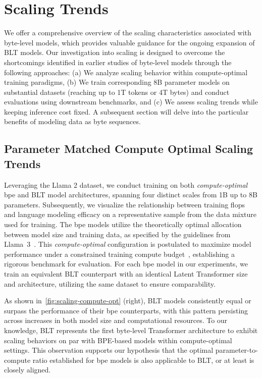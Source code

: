 \section{Scaling Trends}
\label{section:scaling}

We offer a comprehensive overview of the scaling characteristics associated with byte-level models, which provides valuable guidance for the ongoing expansion of {\textsc BLT} models. Our investigation into scaling is designed to overcome the shortcomings identified in earlier studies of byte-level models through the following approaches: (a) We analyze scaling behavior within compute-optimal training paradigms, (b) We train corresponding 8B parameter models on substantial datasets (reaching up to 1T tokens or 4T bytes) and conduct evaluations using downstream benchmarks, and (c) We assess scaling trends while keeping inference cost fixed. A subsequent section will delve into the particular benefits of modeling data as byte sequences.

\subsection{Parameter Matched Compute Optimal Scaling Trends}
\label{section:parameter-matched-scaling}
Leveraging the Llama 2 dataset, we conduct training on both \textit{compute-optimal} bpe and {\textsc BLT} model architectures, spanning four distinct scales from 1B up to 8B parameters. Subsequently, we visualize the relationship between training flops and language modeling efficacy on a representative sample from the data mixture used for training. The bpe models utilize the theoretically optimal allocation between model size and training data, as specified by the guidelines from Llama~3~\citep{dubey2024llama}. This \textit{compute-optimal} configuration is postulated to maximize model performance under a constrained training compute budget~\citep{hoffmann2022training}, establishing a rigorous benchmark for evaluation. For each bpe model in our experiments, we train an equivalent {\textsc BLT} counterpart with an identical Latent Transformer size and architecture, utilizing the same dataset to ensure comparability.

As shown in~\autoref{fig:scaling-compute-opt} (right), {\textsc BLT} models consistently equal or surpass the performance of their bpe counterparts, with this pattern persisting across increases in both model size and computational resources. To our knowledge, {\textsc BLT} represents the first byte-level Transformer architecture to exhibit scaling behaviors on par with BPE-based models within compute-optimal settings. This observation supports our hypothesis that the optimal parameter-to-compute ratio established for bpe models is also applicable to {\textsc BLT}, or at least is closely aligned.

